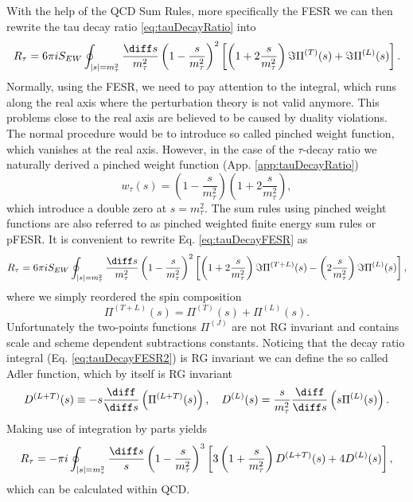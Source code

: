 With the help of the QCD Sum Rules, more specifically the FESR we can then rewrite the tau decay ratio \eqref{eq:tauDecayRatio} into
\begin{equation}
	\label{eq:tauRatioFESR}
	R_\tau = 6 \pi i S_{EW} \oint_{|s|=m_\tau^2} \frac{\diff s}{m_\tau^2} \left(1 - \frac{s}{m_\tau^2} \right)^2 \left[ \left( 1 + 2 \frac{s}{m_\tau^2} \right) \Im \Pi^{(T)} (s) + \Im \Pi^{(L)} (s) \right].
\end{equation}
Normally, using the FESR, we need to pay attention to the integral, which runs along the real axis where the perturbation theory is not valid anymore. This problems close to the real axis are believed to be caused by duality violations. The normal procedure would be to introduce so called pinched weight function, which vanishes at the real axis. However, in the case of the $\tau$-decay ratio we naturally derived a pinched weight function (App. \ref{app:tauDecayRatio})
\begin{equation}
	w_\tau(s) = \left(1 - \frac{s}{m_\tau^2}\right)\left(1 + 2 \frac{s}{m_\tau^2} \right),
\end{equation}
which introduce a double zero at $s=m_\tau^2$. The sum rules using pinched weight functions are also referred to as pinched weighted finite energy sum rules or pFESR.
It is convenient to rewrite Eq. \eqref{eq:tauDecayFESR} as
\begin{equation}
		\label{eq:tauRatioFESR2}
	R_\tau = 6 \pi i S_{EW} \oint_{|s|=m_\tau^2} \frac{\diff s}{m_\tau^2} \left(1 - \frac{s}{m_\tau^2} \right)^2 \left[ \left( 1 + 2 \frac{s}{m_\tau^2} \right) \Im \Pi^{(T+L)} (s) - \left(2 \frac{s}{m_\tau^2}\right) \Im \Pi^{(L)} (s) \right],
\end{equation}
where we simply reordered the spin composition
\begin{equation}
	\Pi^{(T+L)}(s) = \Pi^{(T)}(s) + \Pi^{(L)}(s).
\end{equation}
Unfortunately the two-points functions $\Pi^{(J)}$ are not RG invariant and contains scale and scheme dependent subtractions constants. Noticing that the decay ratio integral (Eq. \eqref{eq:tauDecayFESR2}) is RG invariant we can define the so called Adler function, which by itself is RG invariant
\begin{equation}
	\label{eq:AdlerTransform}
	D^{(L+T)}(s) \equiv -s \frac{\diff}{\diff s} \left(\Pi^{(L+T)}(s)\right), \quad D^{(L)}(s) = \frac{s}{m_\tau^2} \frac{\diff}{\diff s} \left( s\Pi^{(L)}(s)\right).
\end{equation}
Making use of integration by parts yields
\begin{equation}
	R_\tau = - \pi i \oint_{|s|=m_\tau^2} \frac{\diff s}{s} \left( 1 - \frac{s}{m_\tau^2}\right)^3 \left[ 3\left( 1 + \frac{s}{m_\tau^2}\right) D^{(L+T)}(s) + 4 D^{(L)}(s) \right],
\end{equation}
which can be calculated within QCD.


